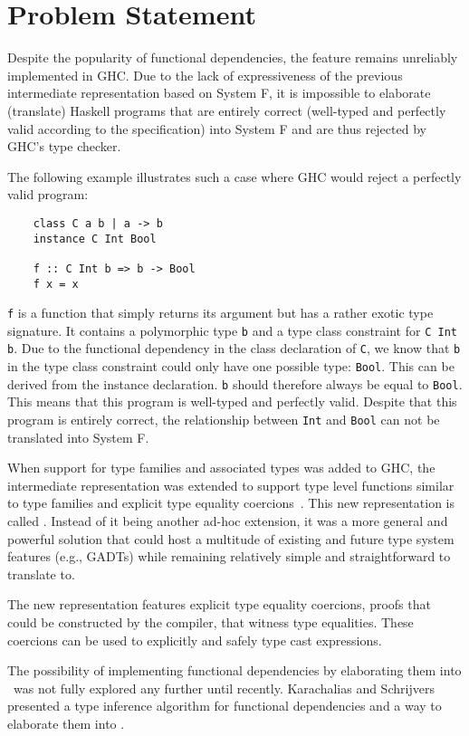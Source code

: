 \section{Problem Statement}
\label{sec:problem-statement}
Despite the popularity of functional dependencies, the feature remains unreliably
implemented in GHC. Due to the lack of expressiveness of the previous intermediate
representation based on System F, it is impossible to elaborate (translate)
Haskell programs that are entirely correct (well-typed and perfectly valid
according to the specification) into System F and are thus rejected by GHC's type
checker.

The following example illustrates such a case where GHC would reject a perfectly
valid program:
\begin{verbatim}
    class C a b | a -> b
    instance C Int Bool

    f :: C Int b => b -> Bool
    f x = x
\end{verbatim}
%
\texttt{f} is a function that simply returns its argument but has a rather
exotic type signature. It contains a polymorphic type \texttt{b} and a type
class constraint for \texttt{C Int b}. Due to the functional dependency in the
class declaration of \texttt{C}, we know that \texttt{b} in the type class
constraint could only have one possible type: \texttt{Bool}. This can be
derived from the instance declaration. \texttt{b} should therefore always be
equal to \texttt{Bool}. This means that this program is well-typed and perfectly
valid. Despite that this program is entirely correct, the relationship between
\texttt{Int} and \texttt{Bool} can not be translated into System F.

When support for type families and associated types was added to GHC, the
intermediate representation was extended to support type level functions similar
to type families and explicit type equality coercions~\cite{Sulzmann:2007:SFT:1190315.1190324}. This new representation
is called \systemfc. Instead of it being another ad-hoc extension, it was a
more general and powerful solution that could host a multitude of existing and
future type system features (e.g., GADTs) while remaining relatively simple
and straightforward to translate to.

The new representation features explicit type equality coercions, proofs that
could be constructed by the compiler, that witness type equalities. These
coercions can be used to explicitly and safely type cast expressions.

The possibility of implementing functional dependencies by elaborating them into
\systemfc~was not fully explored any further until recently. Karachalias and
Schrijvers\cite{Karachalias:2017:EFD:3156695.3122966} presented a type
inference algorithm for functional dependencies and a way to elaborate them into
\systemfc.

